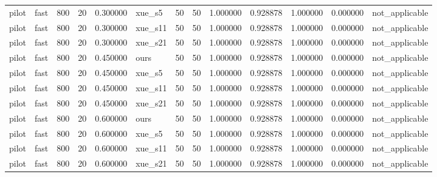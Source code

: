 \begin{longtable}{llrrrlrrrrrrl}
pilot & fast & 800 & 20 & 0.300000 & xue\_s5 & 50 & 50 & 1.000000 & 0.928878 & 1.000000 & 0.000000 & not\_applicable \\
pilot & fast & 800 & 20 & 0.300000 & xue\_s11 & 50 & 50 & 1.000000 & 0.928878 & 1.000000 & 0.000000 & not\_applicable \\
pilot & fast & 800 & 20 & 0.300000 & xue\_s21 & 50 & 50 & 1.000000 & 0.928878 & 1.000000 & 0.000000 & not\_applicable \\
pilot & fast & 800 & 20 & 0.450000 & ours & 50 & 50 & 1.000000 & 0.928878 & 1.000000 & 0.000000 & not\_applicable \\
pilot & fast & 800 & 20 & 0.450000 & xue\_s5 & 50 & 50 & 1.000000 & 0.928878 & 1.000000 & 0.000000 & not\_applicable \\
pilot & fast & 800 & 20 & 0.450000 & xue\_s11 & 50 & 50 & 1.000000 & 0.928878 & 1.000000 & 0.000000 & not\_applicable \\
pilot & fast & 800 & 20 & 0.450000 & xue\_s21 & 50 & 50 & 1.000000 & 0.928878 & 1.000000 & 0.000000 & not\_applicable \\
pilot & fast & 800 & 20 & 0.600000 & ours & 50 & 50 & 1.000000 & 0.928878 & 1.000000 & 0.000000 & not\_applicable \\
pilot & fast & 800 & 20 & 0.600000 & xue\_s5 & 50 & 50 & 1.000000 & 0.928878 & 1.000000 & 0.000000 & not\_applicable \\
pilot & fast & 800 & 20 & 0.600000 & xue\_s11 & 50 & 50 & 1.000000 & 0.928878 & 1.000000 & 0.000000 & not\_applicable \\
pilot & fast & 800 & 20 & 0.600000 & xue\_s21 & 50 & 50 & 1.000000 & 0.928878 & 1.000000 & 0.000000 & not\_applicable \\
\end{longtable}
